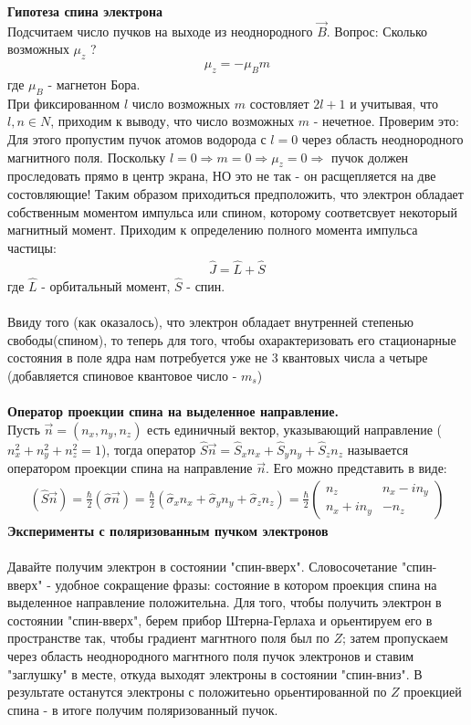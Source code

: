 \documentclass[__main__.tex]{subfiles}
\begin{document}
	\textbf{Гипотеза спина электрона}\\
	Подсчитаем число пучков на выходе из неоднородного $\vec{B}$. Вопрос: Сколько возможных $\mu_z$ ?
	\begin{gather*}
		\mu_z = -\mu_Bm
	\end{gather*}
	где $\mu_B$ - магнетон Бора.\\
	При фиксированном $l$ число возможных $m$ состовляет $2l+1$ и учитывая, что $l,n \in N$, приходим к выводу, что число возможных $m$ - нечетное. Проверим это:\\
	Для этого пропустим пучок атомов водорода с $l=0$ через область неоднородного магнитного поля. Поскольку $l = 0 \Rightarrow m = 0 \Rightarrow \mu_z = 0 \Rightarrow$ пучок должен проследовать прямо в центр экрана, НО это не так - он расщепляется на две состовляющие! Таким образом приходиться предположить, что электрон обладает собственным моментом импульса или спином, которому соответсвует некоторый магнитный момент. Приходим к определению полного момента импульса частицы:
	\begin{gather*}
		\hat{J} = \hat{L}+\hat{S}
	\end{gather*} 
	где $\hat{L}$ - орбитальный момент, $\hat{S}$ - спин.\\\\
	Ввиду того (как оказалось), что электрон обладает внутренней степенью свободы(спином), то теперь для того, чтобы охарактеризовать его стационарные состояния в поле ядра нам потребуется уже не 3 квантовых числа а четыре (добавляется спиновое квантовое число - $m_s$)\\\\
	
	\textbf{Оператор проекции спина на выделенное направление.}\\
	Пусть $\vec{n} = (n_x,n_y,n_z)$ есть единичный вектор, указывающий направление ($n^2_x+n^2_y+n^2_z = 1$), тогда оператор $\hat{S}\vec{n} = \hat{S}_xn_x+\hat{S}_yn_y+\hat{S}_zn_z$ называется оператором проекции спина на направление $\vec{n}$. Его можно представить в виде:
	\begin{gather*}
		\left(\hat{S}\vec{n}\right) = \frac{\hbar}{2}\left(\hat{\sigma}\vec{n}\right)=\frac\hbar2\left(\hat{\sigma}_xn_x+\hat{\sigma}_yn_y+\hat{\sigma}_zn_z\right) = \frac{\hbar}{2}\begin{pmatrix}
			n_z & n_x-in_y\\
			n_x+in_y & -n_z
		\end{pmatrix}
	\end{gather*}
	\textbf{Эксперименты с поляризованным пучком электронов}\\\\
	Давайте получим электрон в состоянии "спин-вверх". Словосочетание "спин-вверх" - удобное сокращение фразы: состояние в котором проекция спина на выделенное направление положительна. Для того, чтобы  получить электрон в состоянии "спин-вверх", берем прибор Штерна-Герлаха и орьентируем его в пространстве так, чтобы градиент магнтного поля был по $Z$; затем пропускаем через область неоднородного магнтного поля пучок электронов и ставим "заглушку" в месте, откуда выходят электроны в состоянии "спин-вниз". В результате останутся электроны с положитеьно орьентированной по $Z$ проекцией спина - в итоге получим поляризованный пучок.  
\end{document}
